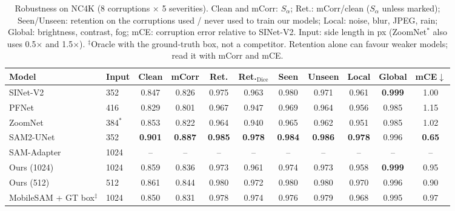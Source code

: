 \begin{table}[t]
\centering
\caption{Robustness on NC4K (8 corruptions $\times$ 5 severities). Clean and mCorr: $S_\alpha$; Ret.: mCorr/clean ($S_\alpha$ unless marked); Seen/Unseen: retention on the corruptions used / never used to train our models; Local: noise, blur, JPEG, rain; Global: brightness, contrast, fog; mCE: corruption error relative to SINet-V2. Input: side length in px (ZoomNet$^*$ also uses 0.5$\times$ and 1.5$\times$). $^\ddagger$Oracle with the ground-truth box, not a competitor. Retention alone can favour weaker models; read it with mCorr and mCE.}
\label{tab:robust-nc4k}
\footnotesize
\setlength{\tabcolsep}{4pt}
\begin{tabular}{llccccccccc}
\toprule
Model & Input & Clean & mCorr & Ret. & Ret.$_{\mathrm{Dice}}$ & Seen & Unseen & Local & Global & mCE$\downarrow$ \\
\midrule
SINet-V2 & 352 & 0.847 & 0.826 & 0.975 & 0.963 & 0.980 & 0.971 & 0.961 & \textbf{0.999} & 1.00 \\
PFNet & 416 & 0.829 & 0.801 & 0.967 & 0.947 & 0.969 & 0.964 & 0.956 & 0.985 & 1.15 \\
ZoomNet & 384$^*$ & 0.853 & 0.822 & 0.964 & 0.940 & 0.965 & 0.962 & 0.951 & 0.985 & 1.02 \\
\midrule
SAM2-UNet & 352 & \textbf{0.901} & \textbf{0.887} & \textbf{0.985} & \textbf{0.978} & \textbf{0.984} & \textbf{0.986} & \textbf{0.978} & 0.996 & \textbf{0.65} \\
SAM-Adapter & 1024 & -- & -- & -- & -- & -- & -- & -- & -- & -- \\
\midrule
Ours (1024) & 1024 & 0.859 & 0.836 & 0.973 & 0.961 & 0.974 & 0.973 & 0.958 & \textbf{0.999} & 0.95 \\
Ours (512) & 512 & 0.861 & 0.844 & 0.980 & 0.972 & 0.980 & 0.980 & 0.970 & 0.996 & 0.90 \\
\midrule
MobileSAM + GT box$^\ddagger$ & 1024 & 0.850 & 0.831 & 0.978 & 0.974 & 0.976 & 0.979 & 0.968 & 0.995 & 0.97 \\
\bottomrule
\end{tabular}
\end{table}
